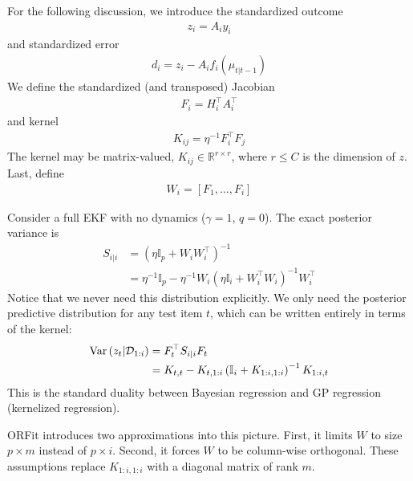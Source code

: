 For the following discussion, we introduce the standardized outcome
\begin{align}
z_{i}=A_{i}y_{i}
\end{align}
and standardized error
\begin{align}
d_{i}=z_{i}-A_{i}f_{i}\left(\mu_{t\vert t-1}\right)
\end{align}
We define the standardized (and transposed) Jacobian 
\begin{align}
F_{i}=H_{i}^{\top}A_{i}^{\top}
\end{align}
and kernel 
\begin{align}
K_{ij}=\eta^{-1}F_{i}^{\top}F_{j}
\end{align}
The kernel may be matrix-valued, $K_{ij}\in\mathbb{R}^{r\times r}$, where $r\le C$ is the dimension of $z$. Last, define
\begin{align}
W_{i}=\left[F_{1},\dots,F_{i}\right]
\end{align}

Consider a full EKF with no dynamics ($\gamma=1$, $q=0$). The exact
posterior variance is
\begin{align}
S_{i\vert i} & =\left(\eta\mathbb{I}_{p}+W_{i}W_{i}^{\top}\right)^{-1}\\
 & =\eta^{-1}\mathbb{I}_{p}-\eta^{-1}W_{i}\left(\eta\mathbb{I}_{i}+W_{i}^{\top}W_{i}\right)^{-1}W_{i}^{\top}
\end{align}
Notice that we never need this distribution explicitly. We only need
the posterior predictive distribution for any test item $t$, which
can be written entirely in terms of the kernel:
\begin{align*}
{\rm Var}\left(z_{t}\vert\mathcal{D}_{1:i}\right) & =F_{t}^{\top}S_{i\vert i}F_{t}\\
 & =K_{t,t}-K_{t,1:i}\left(\mathbb{I}_{i}+K_{1:i,1:i}\right)^{-1}K_{1:i,t}
\end{align*}
This is the standard duality between Bayesian regression and GP regression
(kernelized regression).

ORFit introduces two approximations into this picture. First, it limits
$W$ to size $p\times m$ instead of $p\times i$. Second, it forces
$W$ to be column-wise orthogonal. These assumptions replace $K_{1:i,1:i}$
with a diagonal matrix of rank $m$. 

